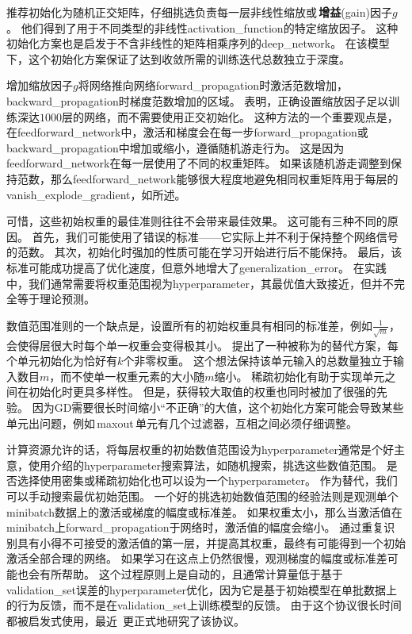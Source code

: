 \cite{Saxe-et-al-ICLR13}推荐初始化为随机正交矩阵，仔细挑选负责每一层非线性缩放或\,\textbf{增益}(gain)因子$g$。
他们得到了用于不同类型的非线性\gls{activation_function}的特定缩放因子。
这种初始化方案也是启发于不含非线性的矩阵相乘序列的\gls{deep_network}。
在该模型下，这个初始化方案保证了达到收敛所需的训练迭代总数独立于深度。


增加缩放因子$g$将网络推向网络\gls{forward_propagation}时激活范数增加，\gls{backward_propagation}时梯度范数增加的区域。
\cite{Sussillo14}表明，正确设置缩放因子足以训练深达$1000$层的网络，而不需要使用正交初始化。
这种方法的一个重要观点是，在\gls{feedforward_network}中，激活和梯度会在每一步\gls{forward_propagation}或\gls{backward_propagation}中增加或缩小，遵循随机游走行为。
这是因为\gls{feedforward_network}在每一层使用了不同的权重矩阵。
如果该随机游走调整到保持范数，那么\gls{feedforward_network}能够很大程度地避免相同权重矩阵用于每层的\gls{vanish_explode_gradient}，如所述。


可惜，这些初始权重的最佳准则往往不会带来最佳效果。
这可能有三种不同的原因。
首先，我们可能使用了错误的标准——它实际上并不利于保持整个网络信号的范数。
其次，初始化时强加的性质可能在学习开始进行后不能保持。
最后，该标准可能成功提高了优化速度，但意外地增大了\gls{generalization_error}。
在实践中，我们通常需要将权重范围视为\gls{hyperparameter}，其最优值大致接近，但并不完全等于理论预测。


数值范围准则的一个缺点是，设置所有的初始权重具有相同的标准差，例如$\frac{1}{\sqrt{m}}$，会使得层很大时每个单一权重会变得极其小。
\cite{martens2010hessian-small}提出了一种被称为的替代方案，每个单元初始化为恰好有$k$个非零权重。
这个想法保持该单元输入的总数量独立于输入数目$m$，而不使单一权重元素的大小随$m$缩小。
稀疏初始化有助于实现单元之间在初始化时更具多样性。
但是，获得较大取值的权重也同时被加了很强的先验。
因为\gls{GD}需要很长时间缩小``不正确''的大值，这个初始化方案可能会导致某些单元出问题，例如\,\gls{maxout}\,单元有几个过滤器，互相之间必须仔细调整。


计算资源允许的话，将每层权重的初始数值范围设为\gls{hyperparameter}通常是个好主意，使用介绍的\gls{hyperparameter}搜索算法，如随机搜索，挑选这些数值范围。
是否选择使用密集或稀疏初始化也可以设为一个\gls{hyperparameter}。
作为替代，我们可以手动搜索最优初始范围。
一个好的挑选初始数值范围的经验法则是观测单个\gls{minibatch}数据上的激活或梯度的幅度或标准差。
如果权重太小，那么当激活值在\gls{minibatch}上\gls{forward_propagation}于网络时，激活值的幅度会缩小。
通过重复识别具有小得不可接受的激活值的第一层，并提高其权重，最终有可能得到一个初始激活全部合理的网络。
如果学习在这点上仍然很慢，观测梯度的幅度或标准差可能也会有所帮助。
这个过程原则上是自动的，且通常计算量低于基于\gls{validation_set}误差的\gls{hyperparameter}优化，因为它是基于初始模型在单批数据上的行为反馈，而不是在\gls{validation_set}上训练模型的反馈。
由于这个协议很长时间都被启发式使用，最近~\cite{mishkin2015all}更正式地研究了该协议。


